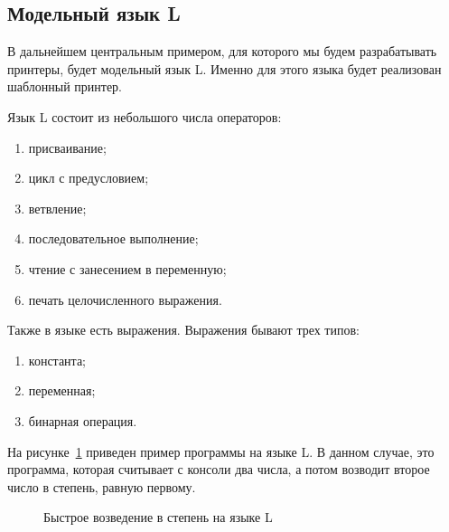\subsection{Модельный язык L}

В дальнейшем центральным примером, для которого мы будем разрабатывать принтеры, будет модельный язык L. Именно для этого языка будет реализован шаблонный принтер.

Язык L состоит из небольшого числа операторов:
\begin{enumerate}
	\item присваивание;
	\item цикл с предусловием;
	\item ветвление;
	\item последовательное выполнение;
	\item чтение с занесением в переменную;
	\item печать целочисленного выражения.
\end{enumerate}

Также в языке есть выражения. Выражения бывают трех типов:
\begin{enumerate}
	\item константа;
	\item переменная;
	\item бинарная операция.
\end{enumerate}

На рисунке~\ref{fig:lEx} приведен пример программы на языке L. В данном случае, это программа, которая считывает с консоли два числа, а потом возводит второе число в степень, равную первому.

\begin{figure}[h!]
	\centering
	
	\caption{Быстрое возведение в степень на языке L}
	\label{fig:lEx}
\end{figure}